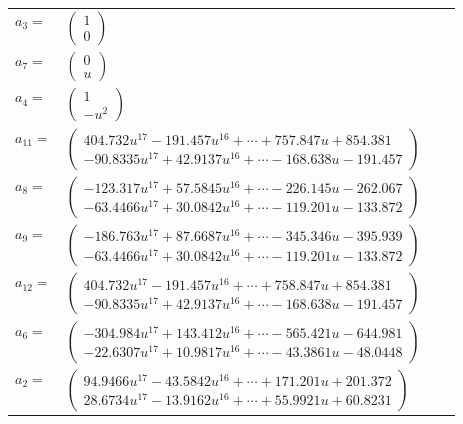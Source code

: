 \documentclass[1p]{elsarticle_modified}
\theoremstyle{definition}
\begin{document}
\begin{tabular}{m{7pt} m{180pt} m{7pt} m{180pt} }
\flushright $a_{3}=$&$\begin{pmatrix}1\\0\end{pmatrix}$ \\
\flushright $a_{7}=$&$\begin{pmatrix}0\\u\end{pmatrix}$ \\
\flushright $a_{4}=$&$\begin{pmatrix}1\\- u^2\end{pmatrix}$ \\
\flushright $a_{11}=$&$\begin{pmatrix}404.732 u^{17}-191.457 u^{16}+\cdots+757.847 u+854.381\\-90.8335 u^{17}+42.9137 u^{16}+\cdots-168.638 u-191.457\end{pmatrix}$ \\
\flushright $a_{8}=$&$\begin{pmatrix}-123.317 u^{17}+57.5845 u^{16}+\cdots-226.145 u-262.067\\-63.4466 u^{17}+30.0842 u^{16}+\cdots-119.201 u-133.872\end{pmatrix}$ \\
\flushright $a_{9}=$&$\begin{pmatrix}-186.763 u^{17}+87.6687 u^{16}+\cdots-345.346 u-395.939\\-63.4466 u^{17}+30.0842 u^{16}+\cdots-119.201 u-133.872\end{pmatrix}$ \\
\flushright $a_{12}=$&$\begin{pmatrix}404.732 u^{17}-191.457 u^{16}+\cdots+758.847 u+854.381\\-90.8335 u^{17}+42.9137 u^{16}+\cdots-168.638 u-191.457\end{pmatrix}$ \\
\flushright $a_{6}=$&$\begin{pmatrix}-304.984 u^{17}+143.412 u^{16}+\cdots-565.421 u-644.981\\-22.6307 u^{17}+10.9817 u^{16}+\cdots-43.3861 u-48.0448\end{pmatrix}$ \\
\flushright $a_{2}=$&$\begin{pmatrix}94.9466 u^{17}-43.5842 u^{16}+\cdots+171.201 u+201.372\\28.6734 u^{17}-13.9162 u^{16}+\cdots+55.9921 u+60.8231\end{pmatrix}$ \\

\end{tabular}
\end{document}
